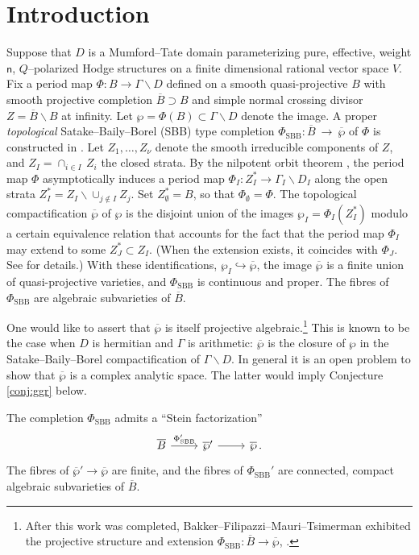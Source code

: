 \documentclass[12pt]{amsart}
\numberwithin{equation}{section}
\numberwithin{table}{section}
\def\sfn{\mathsf{n}}
\def\bs{\backslash}
\def\inj{\hookrightarrow}
\theoremstyle{definition}
\newcounter{proj} %
\theoremstyle{definition}
\theoremstyle{remark}
\def\bs{\backslash}
\def\olB{\overline B}
\def\GsD{\Gamma\bs D}
\def\PhiS{\Phi_\mathrm{SBB}}
\def\hPhiS{\Phi_\mathrm{SBB}'}
\def\hatP{\overline{\wp}{}'}
\def\olP{\overline{\wp}}
\begin{document}
\section{Introduction}

Suppose that $D$ is a Mumford--Tate domain parameterizing pure, effective, weight $\sfn$, $Q$--polarized Hodge structures on a finite dimensional rational vector space $V$.  Fix a period map $\Phi : B \to \GsD$ defined on a smooth quasi-projective $B$ with smooth projective completion $\olB \supset B$ and simple normal crossing divisor $Z = \olB \bs B$ at infinity.  Let $\wp = \Phi(B) \subset \Gamma \bs D$ denote the image.  A proper \emph{topological} Satake--Baily--Borel (SBB) type completion $\PhiS : \olB \ \to \ \olP$ of $\Phi$ is constructed in \cite{GGR-part1}.  Let $Z_1,\ldots,Z_\nu$ denote the smooth irreducible components of $Z$, and $Z_I = \cap_{i\in I}\, Z_i$ the closed strata.  By the nilpotent orbit theorem \cite{MR0382272}, the period map $\Phi$ asymptotically induces a  period map $\Phi_I : Z_I^* \to \Gamma_I\bs D_I$ along the open strata $Z_I^* = Z_I \bs \cup_{j\not\in I}Z_j$.  Set $Z_\emptyset^* = B$, so that $\Phi_\emptyset = \Phi$.  The topological compactification $\olP$ of $\wp$ is the disjoint union of the images $\wp_I = \Phi_I(Z_I^*)$ modulo a certain equivalence relation that accounts for the fact that the period map $\Phi_I$ may extend to some $Z_J^* \subset Z_I$.  (When the extension exists, it coincides with $\Phi_J$.  See \cite[\S3]{GGR-part1} for details.)  With these identifications, $\wp_I \inj \olP$, the image $\olP$ is a finite union of quasi-projective varieties, and $\PhiS$ is continuous and proper.  The fibres of $\PhiS$ are algebraic subvarieties of $\olB$.  

One would like to assert that $\olP$ is itself projective algebraic.\footnote{After this work was completed, Bakker--Filipazzi--Mauri--Tsimerman exhibited the projective structure and extension $\Phi_\mathrm{SBB} : \olB \to \olP$, \cite{BFMT}.}  This is known to be the case when $D$ is hermitian and $\Gamma$ is arithmetic: $\olP$ is the closure of $\wp$ in the Satake--Baily--Borel compactification of $\Gamma\bs D$.  In general it is an open problem to show that $\olP$ is a complex analytic space.  The latter would imply Conjecture \ref{conj:ggr} below.

The completion $\PhiS$ admits a ``Stein factorization''
\[
\begin{tikzcd}
  \olB \arrow[r,"\hPhiS"]
  & \hatP \arrow[r]
  & \olP \,.
\end{tikzcd}
\]
The fibres of $\hatP \to \olP$ are finite, and the fibres of $\hPhiS$ are connected, compact algebraic subvarieties of $\olB$.  
\end{document}
